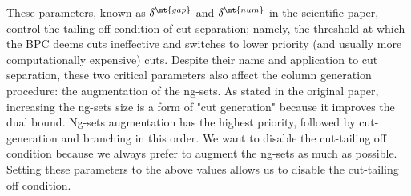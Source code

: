 \begin{itemize}
	      These parameters, known as $\delta^\mt{gap}$ and $\delta^\mt{num}$ in the scientific paper,
	      control the tailing off condition of cut-separation;
	      namely, the threshold at which the BPC deems cuts ineffective
	      and switches to lower priority (and usually more computationally expensive) cuts.
	      Despite their name and application to cut separation,
	      these two critical parameters also affect the column generation procedure:
	      the augmentation of the ng-sets.
	      As stated in the original paper, increasing the ng-sets size is a form of "cut generation"
	      because it improves the dual bound. Ng-sets augmentation has the highest priority,
	      followed by cut-generation and branching in this order.
	      We want to disable the cut-tailing off condition
	      because we always prefer to augment the ng-sets as much as possible.
	      Setting these parameters to the above values allows us to disable the cut-tailing off condition.
\end{itemize}

\begin{comment}
[ About what is reduced cost fixing ]
[ Bucket arc elimination procedure = Reduced cost fixing procedure]
\textcite{sadykov2021}
VRPSolver extension includes an implementation of the pricing functor which
allows the user to define the subproblems as resource constrained shortest path
problems in graphs. The functor implements the bucket-graph based labeling
algorithm from paper [16] for solving the pricing problem, as well as the corre-
sponding bucket arc elimination procedure (i.e. reduced cost fixing procedure),
and the elementary route enumeration procedure [1]. VRPSolver extension also
implements cut separation functors for rounded cap
\end{comment}
